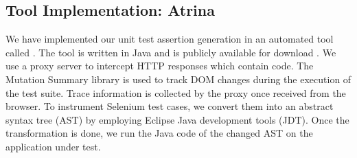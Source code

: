 \subsection{Tool Implementation: Atrina} \label{Sec:tool}
We have implemented our \javascript unit test assertion generation in an automated tool called \tool. The tool is written in Java and is publicly available for download \cite{atrina-dl}.
We use a proxy server to intercept HTTP responses which contain \javascript code. The \javascript Mutation Summary library \cite{mutationSummary} is used to track DOM changes during the execution of the test suite. Trace information is collected by the proxy once received from the browser. To instrument Selenium test cases, we convert them into an abstract syntax tree (AST) by employing Eclipse Java development tools (JDT). Once the transformation is done, we run the Java code of the changed AST on the application under test.   

